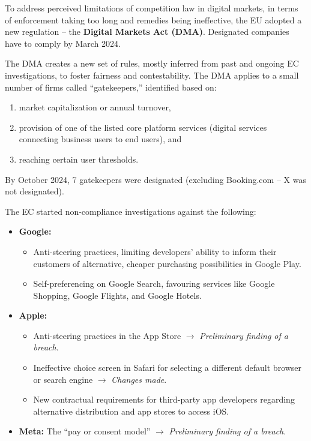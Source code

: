     To address perceived limitations of competition law in digital markets, in terms of enforcement taking too long and remedies being ineffective, the EU adopted a new regulation – the \textbf{Digital Markets Act (DMA)}. Designated companies have to comply by March 2024.
    
    The DMA creates a new set of rules, mostly inferred from past and ongoing EC investigations, to foster fairness and contestability. The DMA applies to a small number of firms called “gatekeepers,” identified based on:
    \begin{enumerate}[label=(\roman*)]
        \item market capitalization or annual turnover,
        \item provision of one of the listed core platform services (digital services connecting business users to end users), and
        \item reaching certain user thresholds.
    \end{enumerate}
    
    By October 2024, 7 gatekeepers were designated (excluding Booking.com – X was not designated).
    
    The EC started non-compliance investigations against the following:
    
    \begin{itemize}
        \item \textbf{Google:}
        \begin{itemize}
            \item Anti-steering practices, limiting developers’ ability to inform their customers of alternative, cheaper purchasing possibilities in Google Play.
            \item Self-preferencing on Google Search, favouring services like Google Shopping, Google Flights, and Google Hotels.
        \end{itemize}
        \item \textbf{Apple:}
        \begin{itemize}
            \item Anti-steering practices in the App Store $\rightarrow$ \textit{Preliminary finding of a breach}.
            \item Ineffective choice screen in Safari for selecting a different default browser or search engine $\rightarrow$ \textit{Changes made}.
            \item New contractual requirements for third-party app developers regarding alternative distribution and app stores to access iOS.
        \end{itemize}
        \item \textbf{Meta:} The “pay or consent model” $\rightarrow$ \textit{Preliminary finding of a breach}.
    \end{itemize}
    
